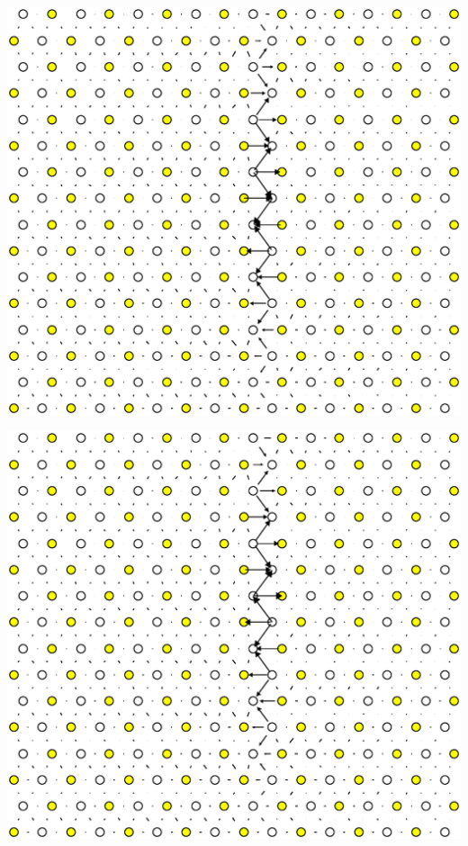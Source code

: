 \documentclass[11pt]{article}
\begin{document}
\begin{enumerate}
\begin{center}
\end{center}
\begin{center}
\includegraphics[width=.9\linewidth]{Images/ddplot_IP3_noo_best_model_alat.eps}
\end{center}
\begin{center}
\includegraphics[width=.9\linewidth]{Images/ddplot_IP4_noo_best_model_alat.eps}
\end{center}
\begin{center}

\end{center}
\end{enumerate}
\end{document}
